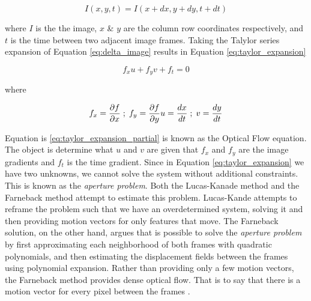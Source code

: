 \begin{equation}
I(x,y,t) = I(x+dx, y+dy, t+dt)
\label{eq:delta_image}
\end{equation}

where $I$ is the the image, $x$ \& $y$ are the column row coordinates
respectively, and $t$ is the time between two adjacent image frames. Taking the
Talylor series expansion of Equation \ref{eq:delta_image} results in Equation
\ref{eq:taylor_expansion}


\begin{equation}
f_x u + f_y v + f_t = 0
\label{eq:taylor_expansion}
\end{equation}

where

\begin{equation}
f_x = \frac{\partial f}{\partial x} \; ; \; f_y = \frac{\partial f}{\partial y} \\
u = \frac{dx}{dt} \; ; \; v = \frac{dy}{dt}
\label{eq:taylor_expansion_partial}
\end{equation}

 Equation is \ref{eq:taylor_expansion_partial} is known as the Optical Flow
 equation. The object is determine what $u$ and $v$ are given that $f_x$ and
 $f_y$ are the image gradients and $f_t$ is the time gradient. Since in Equation
 \ref{eq:taylor_expansion} we have two unknowns, we cannot solve the system
 without additional constraints. This is known as the \textit{aperture problem}.
 Both the Lucas-Kanade method and the Farneback method attempt to estimate this
 problem. Lucas-Kande attempts to reframe the problem such that we have an
 overdetermined system, solving it and then providing motion vectors for only
 features that move. The Farneback solution, on the other hand, argues that is
 possible to solve the \textit{aperture problem} by first approximating each
 neighborhood of both frames with quadratic polynomials, and then estimating the
 displacement fields between the frames using polynomial expansion. Rather than
 providing only a few motion vectors, the Farneback method provides dense
 optical flow. That is to say that there is a motion vector for every pixel
 between the frames \cite{farneback2003two}.

